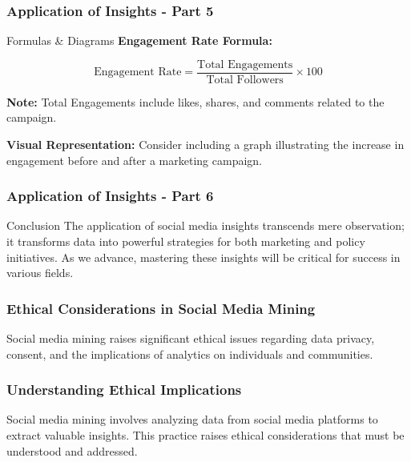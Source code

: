 \documentclass{beamer}
\begin{document}
\begin{frame}[fragile]
    \frametitle{Application of Insights - Part 5}
    \begin{block}{Formulas & Diagrams}
        \textbf{Engagement Rate Formula:}

        \begin{equation}
        \text{Engagement Rate} = \frac{\text{Total Engagements}}{\text{Total Followers}} \times 100
        \end{equation}
        
        \textbf{Note:} Total Engagements include likes, shares, and comments related to the campaign.

        \textbf{Visual Representation:}
        Consider including a graph illustrating the increase in engagement before and after a marketing campaign.
    \end{block}
\end{frame}

\begin{frame}[fragile]
    \frametitle{Application of Insights - Part 6}
    \begin{block}{Conclusion}
        The application of social media insights transcends mere observation; it transforms data into powerful strategies for both marketing and policy initiatives. 
        As we advance, mastering these insights will be critical for success in various fields.
    \end{block}
\end{frame}

\begin{frame}[fragile]
    \frametitle{Ethical Considerations in Social Media Mining}
    Social media mining raises significant ethical issues regarding data privacy, consent, and the implications of analytics on individuals and communities.
\end{frame}

\begin{frame}[fragile]
    \frametitle{Understanding Ethical Implications}
    Social media mining involves analyzing data from social media platforms to extract valuable insights. This practice raises ethical considerations that must be understood and addressed.
\end{frame}
\end{document}
